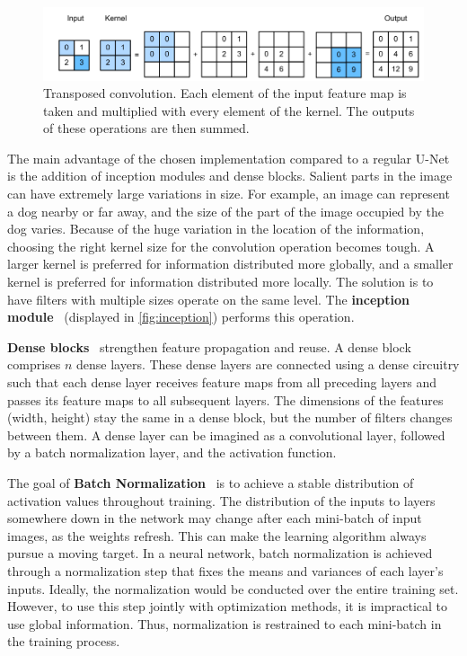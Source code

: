 \begin{figure}[h]
	\centering
	\includegraphics[width=0.9\linewidth]{images/approaches/deep_learning/deconv_w.png}
	\caption{Transposed convolution. Each element of the input feature map is taken and multiplied with every element of the kernel. The outputs of these operations are then summed.}
	\label{fig:deconv}
\end{figure}

The main advantage of the chosen implementation compared to a regular U-Net is the addition of inception modules and dense blocks.
Salient parts in the image can have extremely large variations in size.
For example, an image can represent a dog nearby or far away, and the size of the part of the image occupied by the dog varies.
Because of the huge variation in the location of the information, choosing the right kernel size for the convolution operation becomes tough.
A larger kernel is preferred for information distributed more globally, and a smaller kernel is preferred for information distributed more locally.
The solution is to have filters with multiple sizes operate on the same level. The \textbf{inception module}~\cite{szegedy2015going} (displayed in \autoref{fig:inception}) performs this operation.

\textbf{Dense blocks}~\cite{huang2017densely} strengthen feature propagation and reuse.
A dense block comprises $n$ dense layers. These dense layers are connected using a dense circuitry such that each dense layer receives feature maps from all preceding layers and passes its feature maps to all subsequent layers.
The dimensions of the features (width, height) stay the same in a dense block, but the number of filters changes between them.
A dense layer can be imagined as a convolutional layer, followed by a batch normalization layer, and the activation function.

The goal of \textbf{Batch Normalization}~\cite{ioffe2015batch} is to achieve a stable distribution of activation values throughout training.
The distribution of the inputs to layers somewhere down in the network may change after each mini-batch of input images, as the weights refresh.
This can make the learning algorithm always pursue a moving target.
In a neural network, batch normalization is achieved through a normalization step that fixes the means and variances of each layer's inputs.
Ideally, the normalization would be conducted over the entire training set.
However, to use this step jointly with optimization methods, it is impractical to use global information.
Thus, normalization is restrained to each mini-batch in the training process.

